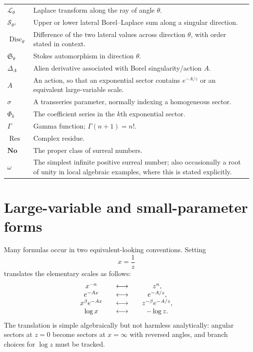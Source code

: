 \documentclass[11pt,openany]{book}
\theoremstyle{definition}
\theoremstyle{plain}
\theoremstyle{remark}
\DeclareMathOperator{\Res}{Res}
\newcommand{\Laplace}{\mathcal{L}}
\newcommand{\Stokes}{\mathfrak{S}}
\newcommand{\alien}{\Delta}
\newcommand{\lateralsum}[1]{\mathcal{S}_{#1}}
\begin{document}
\begin{longtable}{@{}p{}p{}@{}}
$\Laplace_\theta$ & Laplace transform along the ray of angle $\theta$.\\
$\lateralsum{\theta^\pm}$ & Upper or lower lateral Borel--Laplace sum along a
singular direction.\\
$\operatorname{Disc}_\theta$ & Difference of the two lateral values across
direction $\theta$, with order stated in context.\\
$\Stokes_\theta$ & Stokes automorphism in direction $\theta$.\\
$\alien_A$ & Alien derivative associated with Borel singularity/action $A$.\\
$A$ & An action, so that an exponential sector contains $e^{-A/z}$ or an
equivalent large-variable scale.\\
$\sigma$ & A transseries parameter, normally indexing a homogeneous sector.\\
$\Phi_k$ & The coefficient series in the $k$th exponential sector.\\
$\Gamma$ & Gamma function; $\Gamma(n+1)=n!$.\\
$\Res$ & Complex residue.\\
$\mathbf{No}$ & The proper class of surreal numbers.\\
$\omega$ & The simplest infinite positive surreal number; also occasionally a
root of unity in local algebraic examples, where this is stated explicitly.\\

\end{longtable}
\renewcommand{\arraystretch}{1}

\section{Large-variable and small-parameter forms}

Many formulas occur in two equivalent-looking conventions. Setting
\[
 x=\frac1z
\]
translates the elementary scales as follows:
\[
 \begin{array}{c@{\qquad\longleftrightarrow\qquad}c}
 x^{-n} & z^n,\\
 e^{-Ax} & e^{-A/z},\\
 x^\beta e^{-Ax} & z^{-\beta}e^{-A/z},\\
 \log x & -\log z.
 \end{array}
\]
The translation is simple algebraically but not harmless analytically:
angular sectors at $z=0$ become sectors at $x=\infty$ with reversed angles,
and branch choices for $\log z$ must be tracked.
\end{document}
